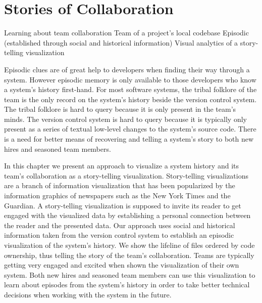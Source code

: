 

\chapter{Stories of Collaboration}
\label{the chapter on chronia}

\infobox
	{Learning about team collaboration}
	{Team of a project's local codebase}
	{Episodic (established through social and historical information)}
	{Visual analytics of a story-telling visualization}

Episodic clues are of great help to developers when finding their way through a system. However episodic memory is only available to those developers who know a system's history first-hand. For most software systems, the tribal folklore of the team is the only record on the system's history beside the version control system. The tribal folklore is hard to query because it is only present in the team's minds. The version control system is hard to query because it is typically only present as a series of textual low-level changes to the system's source code. There is a need for better means of recovering and telling a system's story to both new hires and seasoned team members.

In this chapter we present an approach to visualize a system history and its team's collaboration as a story-telling visualization. Story-telling visualizations are a branch of information visualization that has been popularized by the information graphics of newspapers such as the New York Times and the Guardian. A story-telling visualization is supposed to invite its reader to get engaged with the visualized data by establishing a personal connection between the reader and the presented data. Our approach uses social and historical information taken from the version control system to establish an episodic visualization of the system's history. We show the lifeline of files ordered by code ownership, thus telling the story of the team's collaboration. Teams are typically getting very engaged and excited when shown the visualization of their own system. Both new hires and seasoned team members can use this visualization to learn about episodes from the system's history in order to take better technical decisions when working with the system in the future.

\asteriskasteriskasterisk

